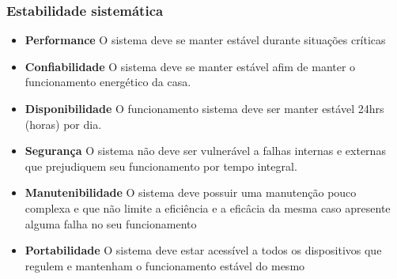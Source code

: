 \subsubsection{Estabilidade sistemática}
\begin{itemize}

	\item \textbf{Performance}
	O sistema deve se manter estável durante situações críticas

	\item \textbf{Confiabilidade}
	O sistema deve se manter estável afim de manter o funcionamento energético da casa.

	\item \textbf{Disponibilidade}
	O funcionamento sistema deve ser manter estável 24hrs (horas) por dia.

	\item \textbf{Segurança}
	O sistema não deve ser vulnerável a falhas internas e externas que prejudiquem seu funcionamento por tempo integral.

	\item \textbf{Manutenibilidade}
	O sistema deve possuir uma manutenção pouco complexa e que não limite a eficiência e a eficâcia da mesma caso
	apresente alguma falha no seu funcionamento

	\item \textbf{Portabilidade}
	O sistema deve estar acessível a todos os dispositivos que regulem e mantenham o funcionamento estável do mesmo

\end{itemize}

